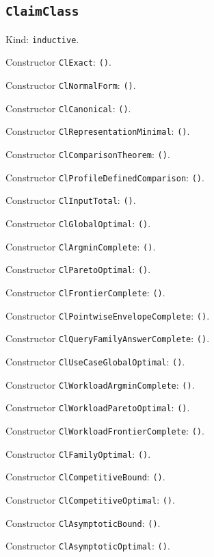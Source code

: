 \documentclass[11pt]{article}
\begin{document}
\subsection*{\texttt{ClaimClass}}
\noindent Kind: \texttt{inductive}.\par
\noindent Constructor \texttt{ClExact}: \texttt{()}.\par
\noindent Constructor \texttt{ClNormalForm}: \texttt{()}.\par
\noindent Constructor \texttt{ClCanonical}: \texttt{()}.\par
\noindent Constructor \texttt{ClRepresentationMinimal}: \texttt{()}.\par
\noindent Constructor \texttt{ClComparisonTheorem}: \texttt{()}.\par
\noindent Constructor \texttt{ClProfileDefinedComparison}: \texttt{()}.\par
\noindent Constructor \texttt{ClInputTotal}: \texttt{()}.\par
\noindent Constructor \texttt{ClGlobalOptimal}: \texttt{()}.\par
\noindent Constructor \texttt{ClArgminComplete}: \texttt{()}.\par
\noindent Constructor \texttt{ClParetoOptimal}: \texttt{()}.\par
\noindent Constructor \texttt{ClFrontierComplete}: \texttt{()}.\par
\noindent Constructor \texttt{ClPointwiseEnvelopeComplete}: \texttt{()}.\par
\noindent Constructor \texttt{ClQueryFamilyAnswerComplete}: \texttt{()}.\par
\noindent Constructor \texttt{ClUseCaseGlobalOptimal}: \texttt{()}.\par
\noindent Constructor \texttt{ClWorkloadArgminComplete}: \texttt{()}.\par
\noindent Constructor \texttt{ClWorkloadParetoOptimal}: \texttt{()}.\par
\noindent Constructor \texttt{ClWorkloadFrontierComplete}: \texttt{()}.\par
\noindent Constructor \texttt{ClFamilyOptimal}: \texttt{()}.\par
\noindent Constructor \texttt{ClCompetitiveBound}: \texttt{()}.\par
\noindent Constructor \texttt{ClCompetitiveOptimal}: \texttt{()}.\par
\noindent Constructor \texttt{ClAsymptoticBound}: \texttt{()}.\par
\noindent Constructor \texttt{ClAsymptoticOptimal}: \texttt{()}.\par
\end{document}

